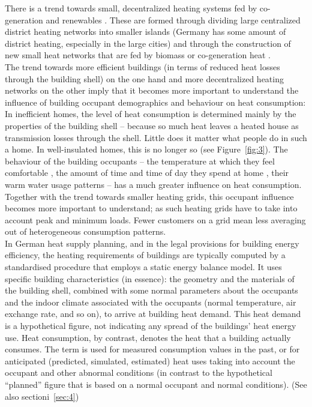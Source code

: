 \documentclass[11pt]{IJM-article}
\begin{document}
There is a trend towards small, decentralized heating systems fed by
co-generation and renewables . These are
formed through dividing large centralized district heating networks into
smaller islands (Germany has some amount of district heating, especially in the
large cities) and through the construction of new small heat networks that are
fed by biomass or co-generation heat .\\

The trend towards more efficient buildings (in terms of reduced heat losses
through the building shell) on the one hand and more decentralized heating
networks on the other imply that it becomes more important to understand the
influence of building occupant demographics and behaviour on heat
consumption: In inefficient homes, the level of heat consumption is determined
mainly by the properties of the building shell -- because so much heat leaves a
heated house as transmission losses through the shell. Little does it matter
what people do in such a home. In well-insulated homes, this is no longer so
(see Figure~\ref{fig:3}).  The behaviour of the building occupants -- the
temperature at which they feel comfortable , the
amount of time and time of day they spend at home , their warm water usage patterns  -- has a
much greater influence on heat consumption.  Together with the trend towards
smaller heating grids, this occupant influence becomes more important to
understand; as such heating grids have to take into account peak and minimum
loads. Fewer customers on a grid mean less averaging out of heterogeneous
consumption patterns.\\

In German heat supply planning, and in the legal provisions for building energy
efficiency, the heating requirements of buildings are typically computed by a
standardised procedure that employs a static energy balance model. It uses
specific building characteristics (in essence): the geometry and the materials
of the building shell, combined with some normal parameters about the occupants
and the indoor climate associated with the occupants (normal temperature, air
exchange rate, and so on), to arrive at building heat demand. This heat demand
is a hypothetical figure, not indicating any spread of the buildings' heat
energy use. Heat consumption, by contrast, denotes the heat that a building
actually consumes. The term is used for measured consumption values in the
past, or for anticipated (predicted, simulated, estimated) heat uses taking
into account the occupant and other abnormal conditions (in contrast to the
hypothetical ``planned'' figure that is based on a normal occupant and normal
conditions). (See also sectioni~\ref{sec:4})\\
\end{document}
